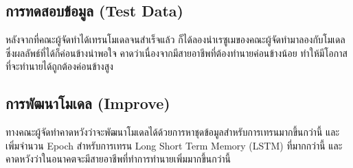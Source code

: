 \subsection{การทดสอบข้อมูล (Test Data)}
หลังจากที่คณะผู้จัดทำได้เทรนโมเดลจนสำเร็จแล้ว ก็ได้ลองนำเรซูเมของคณะผู้จัดทำมาลองกับโมเดล ซึ่งผลลัพธ์ที่ได้ก็ค่อนข้างน่าพอใจ
คาดว่าเนื่องจากมีสายอาชีพที่ต้องทำนายค่อนข้างน้อย ทำให้มีโอกาสที่จะทำนายได้ถูกต้องค่อนข้างสูง

\subsection{การพัฒนาโมเดล (Improve)}
ทางคณะผู้จัดทำคาดหวังว่าจะพัฒนาโมเดลได้ด้วยการหาชุดข้อมูลสำหรับการเทรนมากขึ้นกว่านี้ และเพิ่มจำนวน Epoch สำหรับการเทรน
Long Short Term Memory (LSTM) ที่มากกว่านี้ และคาดหวังว่าในอนาคตจะมีสายอาชีพที่ทำการทำนายเพิ่มมากขึ้นกว่านี้










